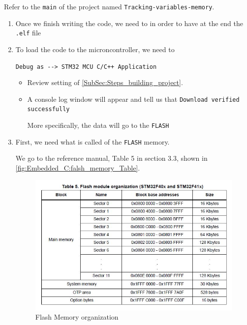 Refer to the \verb|main| of the project named \verb|Tracking-variables-memory|.

\begin{enumerate}
    \item Once we finish writing the code, we need to  in order to have at the end the \verb|.elf| file
    
    
    \item To load the code to the microncontroller, we need to 
    
    \verb|Debug as --> STM32 MCU C/C++ Application|
    
    \begin{itemize}
    
    
    \item Review setting of \ref{SubSec:Steps_building_project}.
    
    
        \item A console log window will appear and tell us that \verb|Download verified successfully |
        
        More specifically, the data will go to the \verb|FLASH|
        
    \end{itemize}
    

    \newpage
    \item First, we need what is called  of the \verb|FLASH| memory.
    
    We go to the reference manual, Table 5 in section 3.3, shown in \autoref{fig:Embedded_C:falsh_memory_Table}.
    
    
    \begin{figure}[h]
\centering
\includegraphics[scale=0.5]{Figures/Embedded_C/falsh_memory_Table}
\caption{Flash Memory organization}
\label{fig:Embedded_C:falsh_memory_Table}
\end{figure} 
    

\end{enumerate}
